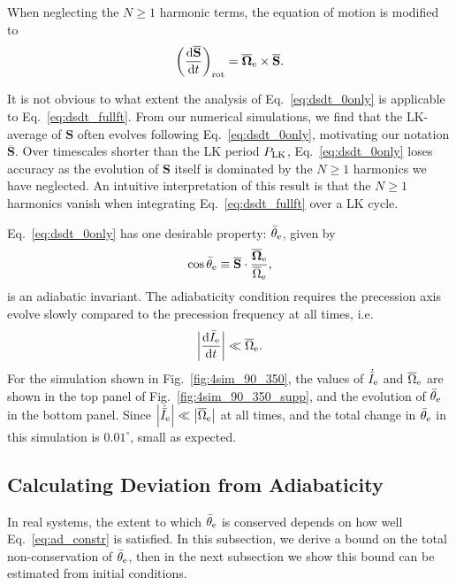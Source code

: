 \documentclass[
        twocolumn,
        twocolappendix
    ]{aastex63}
\newcommand*{\rd}[2]{\frac{\mathrm{d}#1}{\mathrm{d}#2}}
\newcommand*{\abs}[1]{\left|#1\right|}
\renewcommand*{\bm}[1]{\boldsymbol{\mathbf{#1}}}
\newcommand*{\p}[1]{\left(#1\right)}
\begin{document}
When neglecting the $N \geq 1$ harmonic terms, the equation of motion is
modified to
\begin{equation}
    \p{\rd{\bm{\overline{S}}}{t}}_{\rm rot}
        = \bm{\overline{\Omega}}_{\rm e}
            \times \bm{\overline{S}}.\label{eq:dsdt_0only}
\end{equation}

It is not obvious to what extent the analysis of Eq.~\eqref{eq:dsdt_0only} is
applicable to Eq.~\eqref{eq:dsdt_fullft}. From our numerical simulations, we
find that the LK-average of $\bm{S}$ often evolves following
Eq.~\eqref{eq:dsdt_0only}, motivating our notation $\bm{\overline{S}}$. Over
timescales shorter than the LK period $P_{\rm LK}$, Eq.~\eqref{eq:dsdt_0only}
loses accuracy as the evolution of $\bm{S}$ itself is dominated by the $N \geq
1$ harmonics we have neglected. An intuitive interpretation of this result is
that the $N \geq 1$ harmonics vanish when integrating Eq.~\eqref{eq:dsdt_fullft}
over a LK cycle.

Eq.~\eqref{eq:dsdt_0only} has one desirable property: $\bar{\theta}_{\rm e}$,
given by
\begin{equation}
    \cos \bar{\theta}_{\rm e} \equiv
        \bm{\overline{S}} \cdot \frac{\bm{\overline{\Omega}}_{\rm
            e}}{\overline{\Omega}_{\rm e}},
        \label{eq:q_eff}
\end{equation}
is an adiabatic invariant. The adiabaticity condition requires the precession
axis evolve slowly compared to the precession frequency at all times, i.e.
\begin{equation}
    \abs{\rd{\bar{I}_{\rm e}}{t}} \ll \overline{\Omega}_{\rm e}.\label{eq:ad_constr}
\end{equation}
For the simulation shown in Fig.~\ref{fig:4sim_90_350}, the values of
$\dot{\bar{I}}_{\rm e}$ and $\overline{\Omega}_{\rm e}$ are shown in the top
panel of Fig.~\ref{fig:4sim_90_350_supp}, and the evolution of
$\bar{\theta}_{\rm e}$ in the bottom panel. Since $\abs{\dot{\bar{I}}_{\rm e}}
\ll \abs{\overline{\Omega}_{\rm e}}$ at all times, and the total change in
$\bar{\theta}_{\rm e}$ in this simulation is $0.01^\circ$, small as expected.

\subsection{Calculating Deviation from Adiabaticity}\label{ss:eom_0}

In real systems, the extent to which $\bar{\theta}_{\rm e}$ is
conserved depends on how well Eq.~\eqref{eq:ad_constr} is satisfied. In this
subsection, we derive a bound on the total non-conservation of
$\bar{\theta}_{\rm e}$, then in the next subsection we show this bound can be
estimated from initial conditions.
\end{document}
